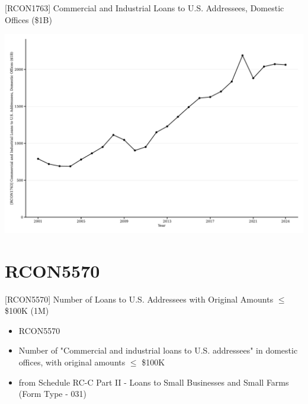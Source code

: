 \documentclass{beamer}
\begin{document}
\begin{frame}{[RCON1763] Commercial and Industrial Loans to U.S. Addressees, Domestic Offices (\$1B)}
\begin{center}
\includegraphics[width=1\textwidth]{figures/Figure_RCON1763_CI_Loans_US_Addressees.pdf}
\end{center}
\end{frame}


\section{RCON5570}
\begin{frame}{[RCON5570] Number of Loans to U.S. Addressees with Original Amounts $\leq$ \$100K (1M)}
\begin{itemize}
    \item RCON5570
    \item Number of "Commercial and industrial loans to U.S. addressees" in domestic offices,  with original amounts $\leq$ \$100K
    \item from Schedule RC-C Part II - Loans to Small Businesses and Small Farms (Form Type - 031)
\end{itemize}
\end{frame}
\end{document}
